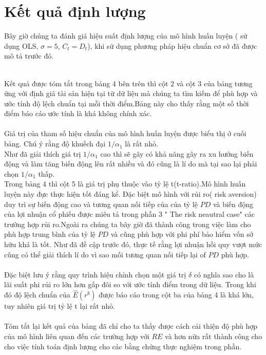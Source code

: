 \documentclass[10pt,a4paper]{article}
\begin{document}
\section{Kết quả định lượng}
Bây giờ chúng ta đánh giá hiệu suất định lượng của mô hình huấn luyện (  sử dụng OLS, $\sigma=5$, $C_t=D_t$), khi sử dụng phương pháp hiệu chuẩn cơ sở đã được mô tả trước đó.\\
\begin{figure}[!h]
	\centering
\end{figure}\\
Kết quả được tóm tắt trong bảng 4 bên trên thì cột 2 và cột 3 của bảng tương ứng với định giá tài sản hiện tại từ dữ liệu mà chúng ta tìm kiếm để phù hợp và ước tính độ lệch chuẩn  tại mỗi thời điểm.Bảng này cho thấy rằng một số thời điểm báo cáo ước tính là khá không chính xác.\\
\\
Giá trị của tham số hiệu chuẩn của mô hình huấn luyện được biểu thị ở cuối bảng. Chú ý rằng độ khuếch đại $1/\alpha_1$ là rất nhỏ.\\
Như đã giải thích giá trị $1/\alpha_1$ cao thì sẽ gây có khả năng gây ra xu hướng biến động và làm tăng biến động lên rất nhiều và đó cũng là lí do mà tại sao lại phải chọn $1/\alpha_1$ thấp.\\
Trong bảng 4 thì cột 5 là giá trị phụ thuộc vào tỷ lệ t(t-ratio).Mô hình huấn luyện này đực thực hiện tốt đáng kể.
Đặc biệt mô hình với rủi ro( risk aversion) duy trì sự biến động cao và tương quan nối tiếp của của tỷ lệ $PD$ và biến động của lợi nhuận cổ phiếu được miêu tả trong phần 3 " The risk neautral case" các trường hợp rủi ro.Ngoài ra chúng ta bây giờ đã thành công trong việc làm cho phù hợp trung bình của tỷ lệ $PD$ và cũng phù hợp với phi phí bảo hiểm vốn sở hữu khá là tốt. Như đã đề cập trước đó, thực tế rằng lợi nhuận hồi quy vượt mức cũng có thể giải thích lí do vì sao mối tương quan nối tiếp lại of $PD$ phù hợp.\\
\\
Đặc biệt lưu ý rằng quy trình hiệu chỉnh chọn một giá trị $\delta$ có nghĩa sao cho là lãi suất phi rủi ro lớn hơn gấp đôi so với ước tính điểm trong dữ liệu. Trong khi đó độ lệch chuẩn của $\widehat E(r^b)$ được báo cáo trong cột ba của bảng 4 là khá lớn, tuy nhiên giá trị tỷ lệ t lại rất nhỏ.\\
\\
Tóm tắt lại kết quả của bảng đã chỉ cho ta thấy được cách cải thiện độ phù hợp của mô hình liên quan đến các trường hợp với $RE$ và hơn nữa rất thành công cho cho việc tính toán định lượng cho các bằng chứng thực nghiệm trong phần.\\
\end{document}
